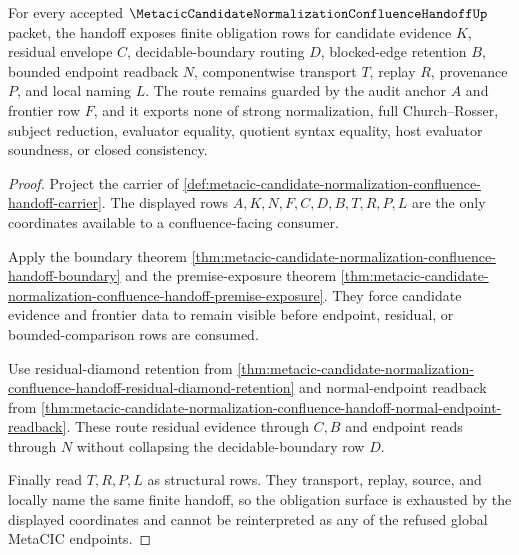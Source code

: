 \begin{theorem}
\label{thm:metacic-candidate-normalization-confluence-handoff-obligation-surface}
For every accepted $\MetacicCandidateNormalizationConfluenceHandoffUp$ packet, the handoff exposes finite obligation rows for candidate evidence $K$, residual envelope $C$, decidable-boundary routing $D$, blocked-edge retention $B$, bounded endpoint readback $N$, componentwise transport $T$, replay $R$, provenance $P$, and local naming $L$. The route remains guarded by the audit anchor $A$ and frontier row $F$, and it exports none of strong normalization, full Church--Rosser, subject reduction, evaluator equality, quotient syntax equality, host evaluator soundness, or closed consistency.
\end{theorem}
\begin{proof}
Project the carrier of \autoref{def:metacic-candidate-normalization-confluence-handoff-carrier}. The displayed rows $A,K,N,F,C,D,B,T,R,P,L$ are the only coordinates available to a confluence-facing consumer.

Apply the boundary theorem \autoref{thm:metacic-candidate-normalization-confluence-handoff-boundary} and the premise-exposure theorem \autoref{thm:metacic-candidate-normalization-confluence-handoff-premise-exposure}. They force candidate evidence and frontier data to remain visible before endpoint, residual, or bounded-comparison rows are consumed.

Use residual-diamond retention from \autoref{thm:metacic-candidate-normalization-confluence-handoff-residual-diamond-retention} and normal-endpoint readback from \autoref{thm:metacic-candidate-normalization-confluence-handoff-normal-endpoint-readback}. These route residual evidence through $C,B$ and endpoint reads through $N$ without collapsing the decidable-boundary row $D$.

Finally read $T,R,P,L$ as structural rows. They transport, replay, source, and locally name the same finite handoff, so the obligation surface is exhausted by the displayed coordinates and cannot be reinterpreted as any of the refused global MetaCIC endpoints.
\end{proof}

